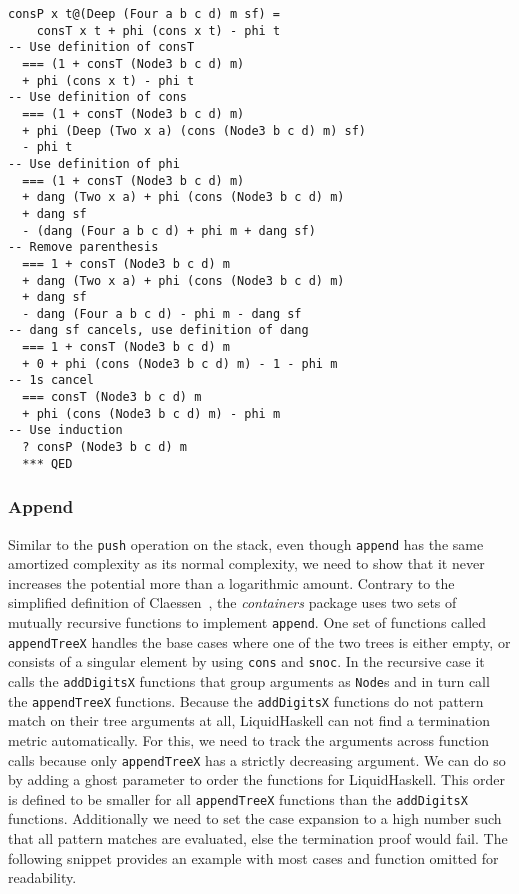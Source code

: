\documentclass[sigplan,screen]{acmart}
\begin{document}
\begin{lstlisting}
consP x t@(Deep (Four a b c d) m sf) =
    consT x t + phi (cons x t) - phi t
-- Use definition of consT
  === (1 + consT (Node3 b c d) m)
  + phi (cons x t) - phi t
-- Use definition of cons
  === (1 + consT (Node3 b c d) m)
  + phi (Deep (Two x a) (cons (Node3 b c d) m) sf)
  - phi t
-- Use definition of phi
  === (1 + consT (Node3 b c d) m)
  + dang (Two x a) + phi (cons (Node3 b c d) m)
  + dang sf
  - (dang (Four a b c d) + phi m + dang sf)
-- Remove parenthesis
  === 1 + consT (Node3 b c d) m
  + dang (Two x a) + phi (cons (Node3 b c d) m)
  + dang sf
  - dang (Four a b c d) - phi m - dang sf
-- dang sf cancels, use definition of dang
  === 1 + consT (Node3 b c d) m
  + 0 + phi (cons (Node3 b c d) m) - 1 - phi m
-- 1s cancel
  === consT (Node3 b c d) m
  + phi (cons (Node3 b c d) m) - phi m
-- Use induction
  ? consP (Node3 b c d) m
  *** QED
\end{lstlisting}

\subsubsection{Append}\label{sec:append}

Similar to the \texttt{push} operation on the stack, even though \texttt{append} has the same amortized complexity as its normal complexity, we need to show that it never increases the potential more than a logarithmic amount. Contrary to the simplified definition of Claessen~\cite{fingertrees_new}, the \textit{containers} package uses two sets of mutually recursive functions to implement \texttt{append}. One set of functions called \texttt{appendTreeX} handles the base cases where one of the two trees is either empty, or consists of a singular element by using \texttt{cons} and \texttt{snoc}. In the recursive case it calls the \texttt{addDigitsX} functions that group arguments as \texttt{Node}s and in turn call the \texttt{appendTreeX} functions. Because the \texttt{addDigitsX} functions do not pattern match on their tree arguments at all, LiquidHaskell can not find a termination metric automatically. For this, we need to track the arguments across function calls because only \texttt{appendTreeX} has a strictly decreasing argument. We can do so by adding a ghost parameter to order the functions for LiquidHaskell. This order is defined to be smaller for all \texttt{appendTreeX} functions than the \texttt{addDigitsX} functions. Additionally we need to set the case expansion to a high number such that all pattern matches are evaluated, else the termination proof would fail. The following snippet provides an example with most cases and function omitted for readability.
\end{document}
